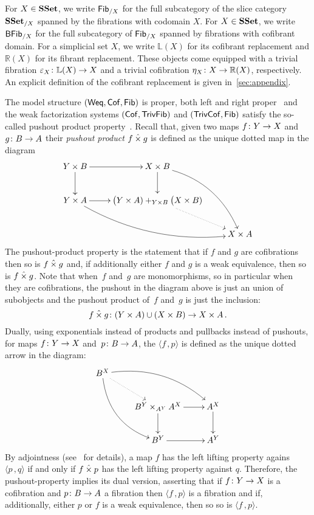 \documentclass[reqno,10pt,a4paper,oneside,draft]{amsart}
\begin{document}
For $X \in \mathbf{SSet}$, we write $\mathsf{Fib}_{/X}$ for the full subcategory of the slice category $\mathbf{SSet}_{/X}$ spanned by the fibrations with codomain $X$. For $X \in \mathbf{SSet}$, we write $\mathsf{BFib}_{/X}$ for  the full subcategory of  $\mathsf{Fib}_{/X}$ spanned by fibrations with cofibrant domain. For a simplicial set $X$, we write $\mathbb{L}(X)$ for its cofibrant replacement and $\mathbb{R}(X)$ for its
fibrant replacement. These objects come equipped with a trivial fibration $\varepsilon_X \colon \mathbb{L}(X) \to X$ and a trivial cofibration $\eta_X \colon 
X \to \mathbb{R}(X)$, respectively. An explicit definition of the cofibrant replacement is given 
in~\cref{sec:appendix}.

\medskip

The model structure $(\mathsf{Weq}, \mathsf{Cof}, \mathsf{Fib})$ is proper, \ie both left and right proper~\cite[proposition 2.2.9 and 3.5.2]{henry2019qms}
and the weak factorization systems $(\mathsf{Cof}, \mathsf{TrivFib})$ and $(\mathsf{TrivCof}, \mathsf{Fib})$
satisfy the so-called pushout product property~\cite[proposition 5.1.5 and corollary 5.2.3]{henry2018wms}. Recall that, given two maps $f \colon Y \rightarrow X$ and $g \colon B \rightarrow A$ their \emph{pushout product} $f \mathbin{\hat{\times}} g$ is defined as the unique dotted map in the diagram
\[
\xymatrix{
Y \times B \ar[r] \ar[d] &  X \times B \ar[d] \ar@/^1.5pc/[ddr] \\
Y \times A \ar[r]  \ar@/_1.5pc/[drr] & \displaystyle \big( Y \times A ) +_{Y \times B} \big( X \times B ) \ar@{.>}[dr]  \\
 & & X \times A }
 \]
The pushout-product property is  the statement that  if $f$ and $g$ are cofibrations then so is $f \mathbin{\hat{\times}} g$
and, if additionally either $f$ and $g$ is a weak equivalence, then so is $f \mathbin{\hat{\times}} g$.
Note that when~$f$ and~$g$ are monomorphisms, so in particular when they are cofibrations, the pushout in the diagram above is just an union of subobjects and the pushout product of~$f$ and~$g$ is just the inclusion:
\[  
f \mathbin{\hat{\times}} g \colon (Y \times A) \cup (X \times B) \rightarrow X \times A \, .
\]
Dually, using  exponentials instead of products and pullbacks instead of pushouts, for maps $f \colon Y \rightarrow X$ and~$p \colon B \rightarrow A$, the   $\langle f \, , p \rangle$ is defined as the unique dotted arrow in the diagram:
\[
\xymatrix{
 B^X \ar@{.>}[dr] \ar@/^1.5pc/[drr] \ar@/_1.5pc/[ddr] \\
& B^Y \times_{A^Y} A^X \ar[r] \ar[d] &  A^X \ar[d]  \\
& B^Y \ar[r] & A^Y  \\
 }
 \]
By adjointness (see~\cite{joyal-tierney-segal} for details), a map $f$ has the left lifting property agains $\langle p \, , q \rangle $ if and only if $f \mathbin{\hat{\times}} p$ has the left lifting property against $q$.
Therefore, the pushout-property  implies its dual version, asserting that  if $f \colon Y \to X$ is a cofibration and $p \colon B \to A$ a fibration then $\langle f \, , p \rangle$ is a fibration and if, additionally,  either $p$ or $f$ is a weak equivalence, then so so is $\langle f \, , p \rangle$.
\end{document}

